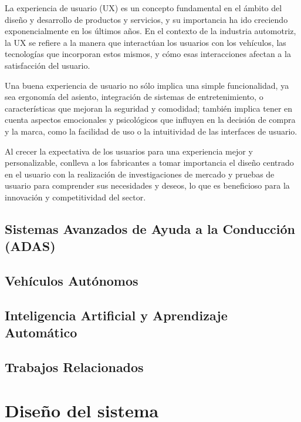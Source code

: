 \documentclass[12pt]{report} %
\begin{document}
La experiencia de usuario (UX) es un concepto fundamental en el ámbito del diseño y desarrollo de productos y servicios, y su importancia ha ido creciendo exponencialmente en los últimos años. En el contexto de la industria automotriz, la UX se refiere a la manera que interactúan los usuarios con los vehículos, las tecnologías que incorporan estos mismos, y cómo esas interacciones afectan a la satisfacción del usuario. \cite{userExperience}

Una buena experiencia de usuario no sólo implica una simple funcionalidad, ya sea ergonomía del asiento, integración de sistemas de entretenimiento, o características que mejoran la seguridad y comodidad; también implica tener en cuenta aspectos emocionales y psicológicos que influyen en la decisión de compra y la marca, como la facilidad de uso o la intuitividad de las interfaces de usuario. 

Al crecer la expectativa de los usuarios para una experiencia mejor y personalizable, conlleva a los fabricantes a tomar importancia el diseño centrado en el usuario con la realización de investigaciones de mercado y pruebas de usuario para comprender sus necesidades y deseos, lo que es beneficioso para la innovación y competitividad del sector. 



\section{Sistemas Avanzados de Ayuda a la Conducción (ADAS)}



\section{Vehículos Autónomos}



\section{Inteligencia Artificial y Aprendizaje Automático}



\section{Trabajos Relacionados}



\chapter{Diseño del sistema}
\end{document}
